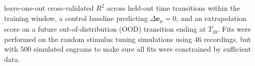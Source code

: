 leave-one-out cross-validated $R^2$ across held-out time transitions within the training window, a control baseline predicting $\Delta\mathbf{e}_\mu = 0$, and an extrapolation score on a future out-of-distribution (OOD) transition ending at $T_{10}$. Fits were performed on the random stimulus tuning simulations using $46$ recordings, but with $500$ simulated engrams to make sure all fits were constrained by sufficient data.
